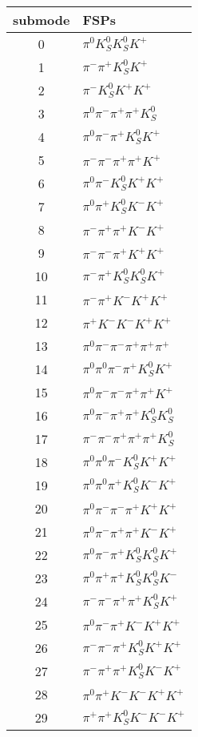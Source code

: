 \begin{table}[h!]
\begin{center}
\begin{tabular}{cl}
\hline
submode& FSPs\\
\hline
0 & $\pi^0 K_S^0 K_S^0 K^+ $ \\
1 & $\pi^- \pi^+ K_S^0 K^+ $ \\
2 & $\pi^- K_S^0 K^+ K^+ $ \\
3 & $\pi^0 \pi^- \pi^+ \pi^+ K_S^0 $ \\
4 & $\pi^0 \pi^- \pi^+ K_S^0 K^+ $ \\
5 & $\pi^- \pi^- \pi^+ \pi^+ K^+ $ \\
6 & $\pi^0 \pi^- K_S^0 K^+ K^+ $ \\
7 & $\pi^0 \pi^+ K_S^0 K^- K^+ $ \\
8 & $\pi^- \pi^+ \pi^+ K^- K^+ $ \\
9 & $\pi^- \pi^- \pi^+ K^+ K^+ $ \\
10 & $\pi^- \pi^+ K_S^0 K_S^0 K^+ $ \\
11 & $\pi^- \pi^+ K^- K^+ K^+ $ \\
12 & $\pi^+ K^- K^- K^+ K^+ $ \\
13 & $\pi^0 \pi^- \pi^- \pi^+ \pi^+ \pi^+ $ \\
14 & $\pi^0 \pi^0 \pi^- \pi^+ K_S^0 K^+ $ \\
15 & $\pi^0 \pi^- \pi^- \pi^+ \pi^+ K^+ $ \\
16 & $\pi^0 \pi^- \pi^+ \pi^+ K_S^0 K_S^0 $ \\
17 & $\pi^- \pi^- \pi^+ \pi^+ \pi^+ K_S^0 $ \\
18 & $\pi^0 \pi^0 \pi^- K_S^0 K^+ K^+ $ \\
19 & $\pi^0 \pi^0 \pi^+ K_S^0 K^- K^+ $ \\
20 & $\pi^0 \pi^- \pi^- \pi^+ K^+ K^+ $ \\
21 & $\pi^0 \pi^- \pi^+ \pi^+ K^- K^+ $ \\
22 & $\pi^0 \pi^- \pi^+ K_S^0 K_S^0 K^+ $ \\
23 & $\pi^0 \pi^+ \pi^+ K_S^0 K_S^0 K^- $ \\
24 & $\pi^- \pi^- \pi^+ \pi^+ K_S^0 K^+ $ \\
25 & $\pi^0 \pi^- \pi^+ K^- K^+ K^+ $ \\
26 & $\pi^- \pi^- \pi^+ K_S^0 K^+ K^+ $ \\
27 & $\pi^- \pi^+ \pi^+ K_S^0 K^- K^+ $ \\
28 & $\pi^0 \pi^+ K^- K^- K^+ K^+ $ \\
29 & $\pi^+ \pi^+ K_S^0 K^- K^- K^+ $ \\

\end{tabular}
\end{center}
\end{table}
